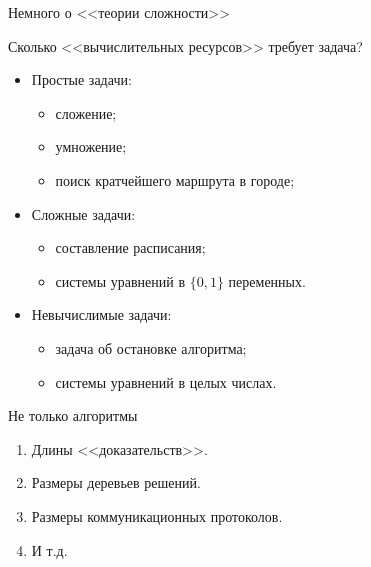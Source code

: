 \begin{frame}{Немного о <<теории сложности>>}

    Сколько <<вычислительных ресурсов>> требует задача?

    \pause
    \begin{itemize}
        \item Простые задачи:
            \begin{itemize}
                \item сложение;
                \item умножение;
                \item поиск кратчейшего маршрута в городе;
            \end{itemize}
        \pause
        \item Сложные задачи:
            \begin{itemize}
                \item составление расписания;
                \item системы уравнений в $\{0, 1\}$ переменных.
            \end{itemize}
        \pause
        \item Невычислимые задачи:
            \begin{itemize}
                \item задача об остановке алгоритма;
                \item системы уравнений в целых числах.
            \end{itemize}
    \end{itemize}
    
\end{frame}

\begin{frame}{Не только алгоритмы}

    \pause
    \begin{enumerate}
        \item Длины <<доказательств>>.
            \pause
        \item Размеры деревьев решений.
            \pause
        \item Размеры коммуникационных протоколов.
        \item И т.д.
    \end{enumerate}
\end{frame}